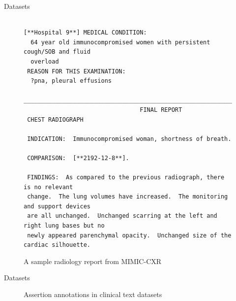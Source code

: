 \documentclass[pdf]{beamer}
\newcommand{\?}{\ensuremath{^\texttt{\bf [CITATION~NEEDED]}}}
\begin{document}
\begin{frame}[fragile]{Datasets}

\begin{figure}
\begin{center}
\tiny
\begin{BVerbatim}

[**Hospital 9**] MEDICAL CONDITION:
  64 year old immunocompromised women with persistent cough/SOB and fluid 
  overload
 REASON FOR THIS EXAMINATION:
  ?pna, pleural effusions                                                         
 ______________________________________________________________________________
                                 FINAL REPORT
 CHEST RADIOGRAPH
 
 INDICATION:  Immunocompromised woman, shortness of breath.
 
 COMPARISON:  [**2192-12-8**].
 
 FINDINGS:  As compared to the previous radiograph, there is no relevant
 change.  The lung volumes have increased.  The monitoring and support devices
 are all unchanged.  Unchanged scarring at the left and right lung bases but no
 newly appeared parenchymal opacity.  Unchanged size of the cardiac silhouette.

\end{BVerbatim}
\end{center}
\caption{A sample radiology report from MIMIC-CXR}
\label{mimic-report}
\end{figure}

\end{frame}

\begin{frame}{Datasets}

\begin{figure}
\centering
{}
\caption{Assertion annotations in clinical text datasets}
\label{fig_datasets}
\end{figure}

\end{frame}
\end{document}
